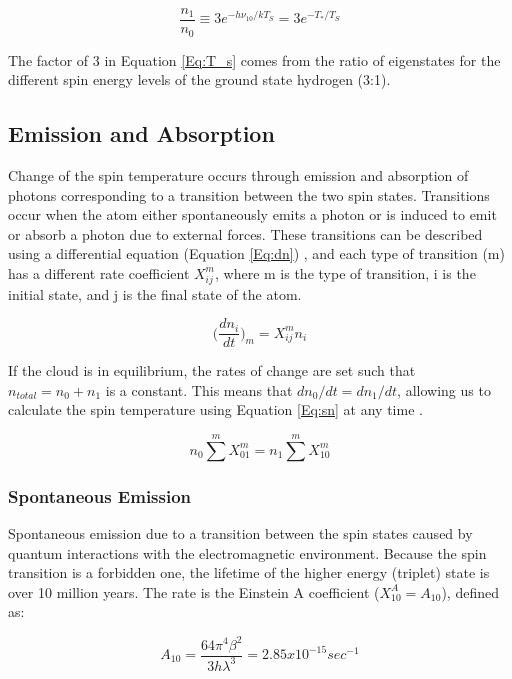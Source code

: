 \begin{equation}\label{Eq:T_s}
\frac{n_1}{n_0} \equiv 3 e^{- h \nu_{10} / kT_S} = 3 e^{-T_*/T_S}
\end{equation} 

The factor of 3 in Equation \ref{Eq:T_s} comes from the ratio of eigenstates for the different spin energy levels of the ground state hydrogen (3:1). 

\subsection{Emission and Absorption} \label{Sec:dT_S}
Change of the spin temperature occurs through emission and absorption of \cm photons corresponding to a transition between the two spin states. Transitions occur when the atom either spontaneously emits a photon or is induced to emit or absorb a photon due to external forces. These transitions can be described using a differential equation (Equation \ref{Eq:dn}) \cite{furlanetto_2006}, and each type of transition (m) has a different rate coefficient $X^m_{ij}$, where m is the type of transition, i is the initial state, and j is the final state of the atom. 

\begin{equation} \label{Eq:dn}
\Big( \frac{d n_i}{dt} \Big)_m = X^m_{ij} n_i
\end{equation}

If the cloud is in equilibrium, the rates of change are set such that $n_{total} = n_0 + n_1$ is a constant. This means that $d n_0/dt = d n_1 /dt$, allowing us to calculate the spin temperature using Equation \ref{Eq:sn} at any time \cite{field_1958}. 

\begin{equation} \label{Eq:sn}
n_0 \sum^m X^m_{01} = n_1 \sum^m X^m_{10}
\end{equation}

\subsubsection{Spontaneous Emission}
Spontaneous emission due to a transition between the spin states caused by quantum interactions with the electromagnetic environment. Because the spin transition is a forbidden one, the lifetime of the higher energy (triplet) state is over 10 million years. The rate is the Einstein A coefficient ($X^A_{10} = A_{10}$), defined as:

\begin{equation}
A_{10} = \frac{64 \pi^4 \beta^2}{3 h \lambda^3} = 2.85 x 10^{-15} sec^{-1}
\end{equation}


